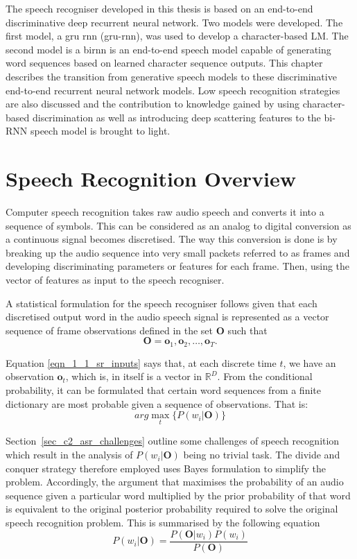 The speech recogniser developed in this thesis is based on an end-to-end discriminative deep recurrent neural network.  Two models were developed.  The first model, a \acrlong{gru} \acrlong{rnn}  (\acrshort{gru}-\acrshort{rnn}), was used to develop a character-based \acrfull{LM}.  The second model is a \acrfull{birnn} is an end-to-end speech model capable of generating word sequences based on learned character sequence outputs.  This chapter describes the transition from generative speech models to these discriminative end-to-end recurrent neural network models.  Low speech recognition strategies are also discussed and the contribution to knowledge gained by using character-based discrimination as well as introducing deep scattering features to the bi-RNN speech model is brought to light.

\section{Speech Recognition Overview}\label{Ch_2_SROverview}
Computer speech recognition takes raw audio speech and converts it into a sequence of symbols.  This can be considered as an analog to digital conversion as a continuous signal becomes discretised.  The way this conversion is done is by breaking up the audio sequence into very small packets referred to as frames and developing discriminating parameters or features for each frame. Then, using the vector of features as input to the speech recogniser.  

A statistical formulation \citep{young2002htk} for the speech recogniser follows given that each discretised output word in the audio speech signal is represented as a vector sequence of frame observations defined in the set $\mathbf{O}$ such that 
\begin{equation}\mathbf{O}=\mathbf{o}_1,\mathbf{o}_2,\dots,\mathbf{o}_T.
\label{eqn_1_1_sr_inputs}
\end{equation}

Equation \ref{eqn_1_1_sr_inputs} says that, at each discrete time $t$, we have an observation $\mathbf{o}_t$, which is, in itself is a vector in $\mathbb{R}^D$.  From the conditional probability, it can be formulated that certain word sequences from a finite dictionary are most probable given a sequence of observations. That is:
\begin{equation}arg\max_t\{P(w_i|\mathbf{O})\}
\label{eqn_2_2_srgen}
\end{equation}

Section~\ref{sec_c2_asr_challenges} outline some challenges of  speech recognition which result in the  analysis of $P(w_i|\mathbf{O})$ being no trivial task.  The divide and conquer strategy therefore employed uses Bayes formulation to simplify the problem.  Accordingly, the argument that maximises the probability of an audio sequence given a particular word multiplied by the prior probability of that word is equivalent to the original posterior probability required to solve the original speech recognition problem. This is summarised by the following equation
\begin{equation}P(w_i|\mathbf{O})=\frac{P(\mathbf{O}|w_i)P(w_i)}{P(\mathbf{O})}
\label{eqn_2_3_bayes_sr}
\end{equation}

